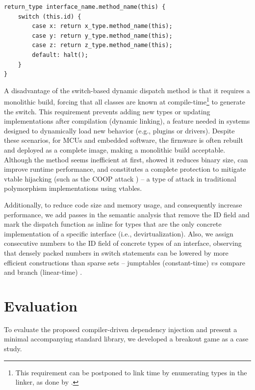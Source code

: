 \documentclass[sigconf]{acmart}
\begin{document}
\begin{lstlisting}[float=tp, caption=Interface switch-based template for dynamic dispatch using the id field., label=lst:interfacestub]
return_type interface_name.method_name(this) {
    switch (this.id) {
        case x: return x_type.method_name(this);
        case y: return y_type.method_name(this);
        case z: return z_type.method_name(this);
        default: halt();
    }
}
\end{lstlisting}


A disadvantage of the switch-based dynamic dispatch method is that it requires a monolithic build, forcing that all classes are known at compile-time\footnote{This requirement can be postponed to link time by enumerating types in the linker, as done by \citet{bauer2021novt}.} to generate the switch. This requirement prevents adding new types or updating implementations after compilation (dynamic linking), a feature needed in systems designed to dynamically load new behavior (e.g., plugins or drivers). Despite these scenarios, for MCUs and embedded software, the firmware is often rebuilt and deployed as a complete image, making a monolithic build acceptable. Although the method seems inefficient at first, \citet{bauer2021novt} showed it reduces binary size, can improve runtime performance, and constitutes a complete protection to mitigate vtable hijacking (such as the COOP attack \cite{schuster2015}) -- a type of attack in traditional polymorphism implementations using vtables. 

Additionally, to reduce code size and memory usage, and consequently increase performance, we add passes in the semantic analysis that remove the ID field and mark the dispatch function as inline for types that are the only concrete implementation of a specific interface (i.e., devirtualization). Also, we assign consecutive numbers to the ID field of concrete types of an interface, observing that densely packed numbers in switch statements can be lowered by more efficient constructions than sparse sets -- jumptables (constant-time) $vs$ compare and branch (linear-time) \cite[Chap. 6]{scott2016plp}.


\section{Evaluation} \label{sec:evaluation}

To evaluate the proposed compiler-driven dependency injection and present a minimal accompanying standard library, we developed a breakout game as a case study.
\end{document}
